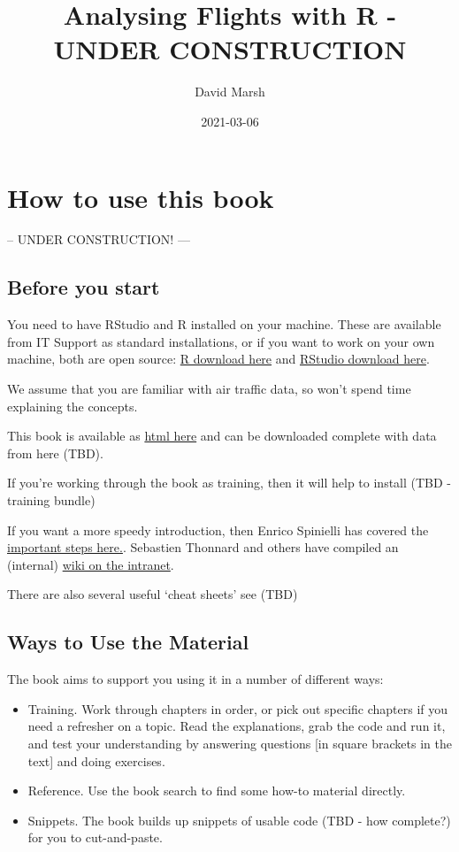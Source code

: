 \documentclass[
]{book}
\title{Analysing Flights with R - UNDER CONSTRUCTION}
\author{David Marsh}
\date{2021-03-06}
\providecommand{\tightlist}{%
  \setlength{\itemsep}{0pt}\setlength{\parskip}{0pt}}
\begin{document}
\maketitle

{
\setcounter{tocdepth}{1}
\tableofcontents
}
\hypertarget{howto}{%
\chapter{How to use this book}\label{howto}}

-- UNDER CONSTRUCTION! ---

\hypertarget{before-you-start}{%
\section{Before you start}\label{before-you-start}}

You need to have RStudio and R installed on your machine. These are available from IT Support as standard installations, or if you want to work on your own machine, both are open source: \href{https://cran.r-project.org}{R download here} and \href{https://rstudio.com/products/rstudio/download/}{RStudio download here}.

We assume that you are familiar with air traffic data, so won't spend time explaining the concepts.

This book is available as \href{https://david6marsh.github.io/flights_in_R/}{html here} and can be downloaded complete with data from here (TBD).

If you're working through the book as training, then it will help to install (TBD - training bundle)

If you want a more speedy introduction, then Enrico Spinielli has covered the \href{https://github.com/euctrl-pru/portal/wiki/Intro-to-everything}{important steps here.}. Sebastien Thonnard and others have compiled an (internal) \href{https://ost.eurocontrol.int/sites/STATFO/WikiPages/R_documentation.aspx}{wiki on the intranet}.

There are also several useful `cheat sheets' see (TBD)

\hypertarget{ways-to-use-the-material}{%
\section{Ways to Use the Material}\label{ways-to-use-the-material}}

The book aims to support you using it in a number of different ways:

\begin{itemize}
\tightlist
\item
  Training. Work through chapters in order, or pick out specific chapters if you need a refresher on a topic. Read the explanations, grab the code and run it, and test your understanding by answering questions {[}in square brackets in the text{]} and doing exercises.
\item
  Reference. Use the book search to find some how-to material directly.
\item
  Snippets. The book builds up snippets of usable code (TBD - how complete?) for you to cut-and-paste.
\end{itemize}
\end{document}
